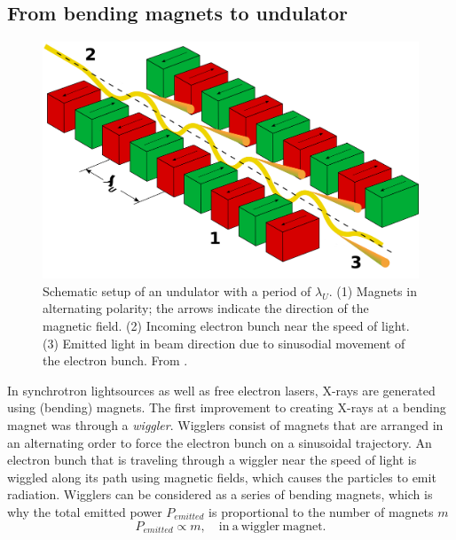 \subsection{From bending magnets to undulator}\label{sec:undulator}
\begin{figure}[t]
	\centering
		\includegraphics[width=1.00\textwidth]{images/Undulator.png}
	\caption[Schematic setup of an undulator.]{Schematic setup of an undulator with a period of $\lambda_{U}$. (1) Magnets in alternating polarity; the arrows indicate the direction of the magnetic field. (2) Incoming electron bunch near the speed of light. (3) Emitted light in beam direction due to sinusodial movement of the electron bunch. From \cite{holst-2005-wiki}.}
	\label{fig:undulator}
\end{figure}
In synchrotron lightsources as well as free electron lasers, X-rays are generated using (bending) magnets. The first improvement to creating X-rays at a bending magnet was through a \textit{wiggler}. Wigglers consist of magnets that are arranged in an alternating order to force the electron bunch on a sinusoidal trajectory. An electron bunch that is traveling through a wiggler near the speed of light is wiggled along its path using magnetic fields, which causes the particles to emit radiation. Wigglers can be considered as a series of bending magnets, which is why the total emitted power $P_{emitted}$ is proportional to the number of magnets $m$ \citep{Brown-1983-NIMPR}
\begin{equation}
P_{emitted} \propto m,\quad \mathrm{in\ a\ wiggler\ magnet}.
\end{equation}
